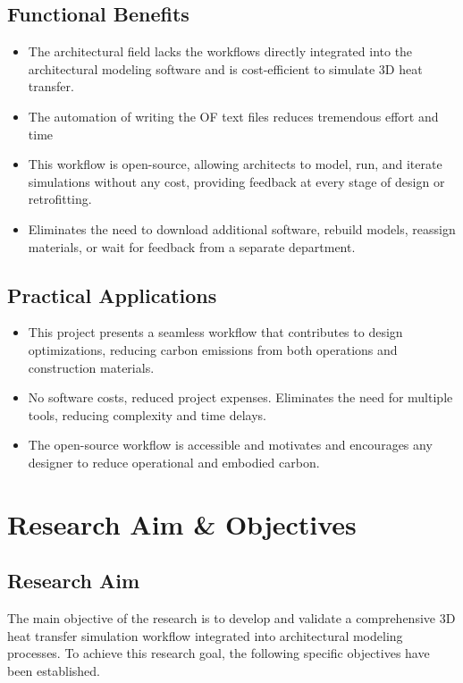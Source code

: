 \subsection{Functional Benefits}
\begin{itemize}
    \item The architectural field lacks the workflows directly integrated into the architectural modeling software and is cost-efficient to simulate \gls{3D} heat transfer.
    \item The automation of writing the OF text files reduces tremendous effort and time
    \item This workflow is open-source, allowing architects to model, run, and iterate simulations without any cost, providing feedback at every stage of design or retrofitting.

    \item Eliminates the need to download additional software, rebuild models, reassign materials, or wait for feedback from a separate department.
\end{itemize}

\subsection{Practical Applications}
\begin{itemize}
\item This project presents a seamless workflow that contributes to design optimizations, reducing carbon emissions from both operations and construction materials.
\item No software costs, reduced project expenses. Eliminates the need for multiple tools, reducing complexity and time delays.
\item The open-source workflow is accessible and motivates and encourages any designer to reduce operational and embodied carbon.


\end{itemize}
\section{Research Aim \& Objectives}
\subsection{Research Aim}
The main objective of the research is to develop and validate a comprehensive 3D heat transfer simulation workflow integrated into architectural modeling processes. To achieve this research goal, the following specific objectives have been established.


